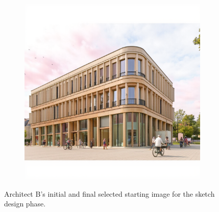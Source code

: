 \begin{figure}[H]
\begin{subfigure}[b]{0.3\textwidth}
        \includegraphics[width=\textwidth]{Images/Results/Architect-B_Fixed-images/1-sketch_design/Met_lora_00026_.png}
        \caption{}
        \label{fig:B-sketch-selected-b}
    \end{subfigure}
    \caption{Architect B's initial and final selected starting image for the sketch design phase.}
    \label{fig:B-sketch-selected}
\end{figure}
